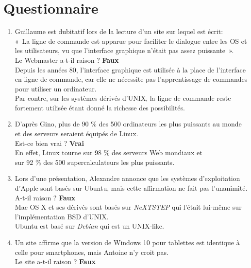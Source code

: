 \section*{Questionnaire}

\begin{enumerate}
  \item Guillaume est dubitatif lors de la lecture d’un site sur lequel est écrit: \\
  « La ligne de commande est apparue pour faciliter le dialogue entre les OS
  et les utilisateurs, vu que l’interface graphique n’était pas assez
  puissante ». \\
  Le Webmaster a-t-il raison ? \textbf{Faux} \\

  Depuis les années 80, l’interface graphique est utilisée à la place de
  l’interface en ligne de commande, car elle ne nécessite pas l'apprentissage
  de commandes pour utiliser un ordinateur.\\
  Par contre, sur les systèmes dérivés d’UNIX, la ligne de commande reste
  fortement utilisée étant donné la richesse des possibilités. \\

  \item D’après Gino, plus de 90 \% des 500 ordinateurs les plus puissants au monde
  et des serveurs seraient équipés de Linux. \\
  Est-ce bien vrai ? \textbf{Vrai}\\

  En effet, Linux tourne sur 98 \% des serveurs Web mondiaux et \\
  sur 92 \% des 500 supercalculateurs les plus puissants. \\

  \item Lors d’une présentation, Alexandre annonce que les systèmes d’exploitation
  d’Apple sont basés sur Ubuntu, mais cette affirmation ne fait pas
  l’unanimité. \\
  A-t-il raison ? \textbf{Faux} \\

  Mac OS X et ses dérivés sont basés sur \textit{NeXTSTEP} qui l'était lui-même
  sur l’implémentation BSD d’UNIX. \\
  Ubuntu est basé sur \textit{Debian} qui est un UNIX-like. \\

  \item Un site affirme que la version de Windows 10 pour tablettes est identique à
  celle pour smartphones, mais Antoine n’y croit pas. \\
  Le site a-t-il raison ? \textbf{Faux} \\


\end{enumerate}
